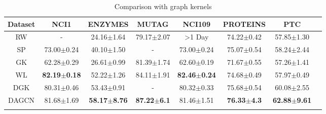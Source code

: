 \documentclass[conference]{IEEEtran}
\begin{document}
\begin{table*}[t]
\centering
\caption{Comparison with graph kernels}
\begin{tabular}{cccccccc}
\hline
Dataset              & NCI1   & ENZYMES                 & MUTAG                   & NCI109                  & PROTEINS                & PTC     \\
\hline
RW           & -                    & 24.16$\pm$1.64       & 79.17$\pm$2.07       & \textgreater 1 Day   & 74.22$\pm$0.42       & 57.85$\pm$1.30 \\
SP                   & 73.00$\pm$0.24       & 40.10$\pm$1.50       & -                    & 73.00$\pm$0.24       & 75.07$\pm$0.54       & 58.24$\pm$2.44 \\
GK                   & 62.28$\pm$0.29          & 26.61$\pm$0.99       & 81.39$\pm$1.74       & 62.60$\pm$0.19       & 71.67$\pm$0.55       & 57.26$\pm$1.41 \\
WL                   & \textbf{82.19$\pm$0.18}             & 52.22$\pm$1.26       & 84.11$\pm$1.91       & \textbf{82.46$\pm$0.24}       & 74.68$\pm$0.49       & 57.97$\pm$0.49 \\
DGK                  & 80.31$\pm$0.46          & 53.43$\pm$0.91       & -                    & 80.32$\pm$0.33       & 75.68$\pm$0.54       & 60.08$\pm$2.55 \\
DAGCN               & 81.68$\pm$1.69          & \textbf{58.17$\pm$8.76}       & \textbf{87.22$\pm$6.1}        & 81.46$\pm$1.51       & \textbf{76.33$\pm$4.3}        & \textbf{62.88$\pm$9.61} \\ 
\hline
\multicolumn{1}{l}{} & \multicolumn{1}{l}{} & \multicolumn{1}{l}{} & \multicolumn{1}{l}{} & \multicolumn{1}{l}{} & \multicolumn{1}{l}{} & \multicolumn{1}{l}{} &               
\end{tabular}
\label{tb:result2}
\end{table*}
\end{document}
